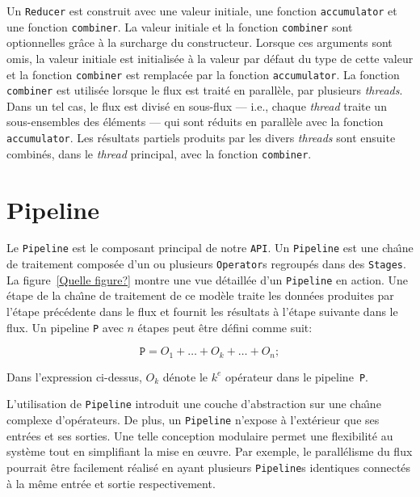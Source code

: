 Un \texttt{Reducer} est construit avec une valeur initiale, une fonction \texttt{accumulator} et une fonction \texttt{combiner}. La valeur initiale et la fonction \texttt{combiner} sont optionnelles gr\^ace \`a la surcharge du constructeur. Lorsque ces arguments sont omis, la valeur initiale est initialis\'ee \`a la valeur par d\'efaut du type de cette valeur et la fonction \texttt{combiner} est remplac\'ee par la fonction \texttt{accumulator}. La fonction \texttt{combiner} est utilis\'ee lorsque le flux est trait\'e en parall\`ele, par plusieurs \emph{threads}. Dans un tel cas, le flux est divis\'e en sous-flux --- i.e., chaque \emph{thread} traite un sous-ensembles des éléments --- qui sont r\'eduits en parall\`ele avec la fonction \texttt{accumulator}. Les r\'esultats partiels produits par les divers \emph{threads} sont ensuite combin\'es, dans le \emph{thread} principal, avec la fonction \texttt{combiner}. 





\section{Pipeline}

Le \texttt{Pipeline} est le composant principal de notre \texttt{API}. Un \texttt{Pipeline} est une cha\^{\i}ne de traitement compos\'ee d'un ou plusieurs \texttt{Operator}s regroup\'es dans des \texttt{Stages}. La figure~\ref{Quelle figure?} montre une vue d\'etaill\'ee d'un \texttt{Pipeline} en action. Une \'etape de la cha\^{\i}ne de traitement de ce mod\`ele traite les donn\'ees produites par l'\'etape pr\'ec\'edente dans le flux et fournit les r\'esultats \`a l'étape suivante dans le flux. Un pipeline \texttt{P} avec $n$ \'etapes peut \^etre d\'efini comme suit:


\[
	\texttt{P} = O_1 +  \ldots + O_k + \ldots + O_n;
\]


Dans l'expression ci-dessus, $O_k$ d\'enote le $k^e$ op\'erateur dans le pipeline~\texttt{P}.

L'utilisation de \texttt{Pipeline} introduit une couche d'abstraction sur une cha\^{\i}ne complexe d'op\'erateurs. De plus, un \texttt{Pipeline} n'expose à l'ext\'erieur que ses entr\'ees et ses sorties. Une telle conception modulaire permet une flexibilit\'e au syst\`eme tout en simplifiant la mise en œuvre. Par exemple, le parall\'elisme du flux pourrait \^etre facilement r\'ealis\'e en ayant plusieurs \texttt{Pipeline}s identiques connect\'es \`a la m\^eme entr\'ee et sortie respectivement.


